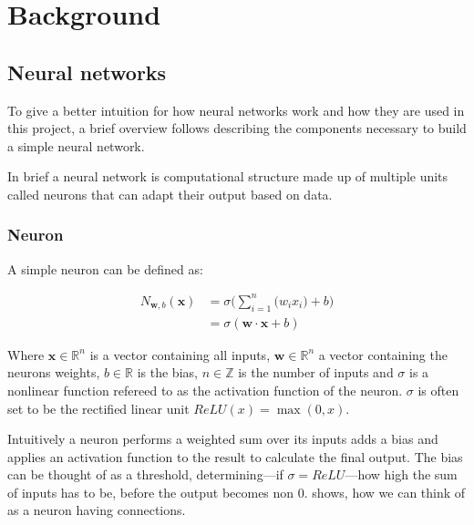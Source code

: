 
\newcommand{\neuronSum}[1][n]{
	\sigma\Bigg(\sum_{i=1}^{#1}{\Big(w_i x_i\Big)} + b\Bigg)
}

\chapter{Background}
\section{Neural networks}
To give a better intuition for how neural networks work and how they are used in this project, a brief overview follows describing the components necessary to build a simple neural network.

In brief a neural network is computational structure made up of multiple units called neurons that can adapt their output based on data.


\subsection{Neuron}
A simple neuron can be defined as:

\begin{equation}
\begin{split}
	N_{\bm w, b}(\bm{x}) & = \neuronSum[n] \\
 	& = \sigma (\bm{w} \cdot \bm{x} + b)
\end{split}
\end{equation}

Where $\bm{x} \in \mathbb{R}^n$ is a vector containing all inputs, $ \bm{w} \in \mathbb{R}^n$ a vector containing the neurons weights, $b \in \mathbb{R}$ is the bias, $n \in \mathbb{Z}$ is the number of inputs and $\sigma$ is a nonlinear function refereed to as the activation function of the neuron. $\sigma$ is often set to be the rectified linear unit $ReLU(x) = \max(0, x)$.

Intuitively a neuron performs a weighted sum over its inputs adds a bias and applies an activation function to the result to calculate the final output. The bias can be thought of as a threshold, determining---if $\sigma = ReLU$---how high the sum of inputs has to be, before the output becomes non 0.  shows, how we can think of as a neuron having connections.

\neuronGraph{p}{$\displaystyle{\neuronSum[3]}$}



